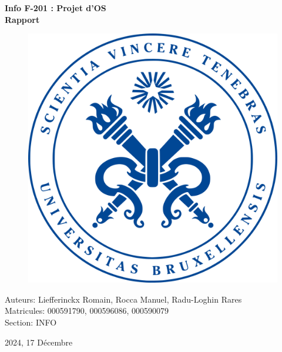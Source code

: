 \documentclass[utf8]{article}
\begin{document}
\begin{titlepage}
    \centering
    
    \vspace*{1cm}
    {\huge \bfseries Info F-201 : Projet d’OS \\
                    Rapport \par}
    
    \vfill
    
    \begin{figure}[h]
        \centering
        \includegraphics[scale=0.2]{logo.png}
    \end{figure}
    
    \vfill
    
    {\large Auteurs: Liefferinckx Romain, Rocca Manuel, Radu-Loghin Rares\\ 
            Matricules: 000591790, 000596086, 000590079 \\ 
            Section: INFO \par}
    {\large 2024, 17 Décembre \par}
\end{titlepage}
\end{document}
